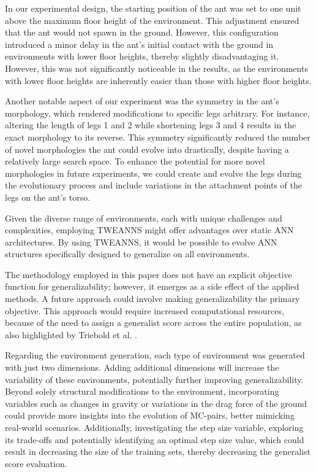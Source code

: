 In our experimental design, the starting position of the ant was set to one unit above the maximum floor height of the environment. This adjustment ensured that the ant would not spawn in the ground. However, this configuration introduced a minor delay in the ant's initial contact with the ground in environments with lower floor heights, thereby slightly disadvantaging it. However, this was not significantly noticeable in the results, as the environments with lower floor heights are inherently easier than those with higher floor heights.

Another notable aspect of our experiment was the symmetry in the ant's morphology, which rendered modifications to  specific legs arbitrary. For instance, altering the length of legs 1 and 2 while shortening legs 3 and 4 results in the exact morphology to its reverse. This symmetry significantly reduced the number of novel morphologies the ant could evolve into drastically, despite having a relatively large search space. To enhance the potential for more novel morphologies in future experiments, we could create and evolve the legs during the evolutionary process and include variations in the attachment points of the legs on the ant's torso. 

Given the diverse range of environments, each with unique challenges and complexities, employing TWEANNS might offer advantages over static ANN architectures. By using TWEANNS, it would be possible to evolve ANN structures specifically designed to generalize on all environments.

The methodology employed in this paper does not have an explicit objective function for generalizability; however, it emerges as a side effect of the applied methods. A future approach could involve making generalizability the primary objective. This approach would require increased computational resources, because of the need to assign a generalist score across the entire population, as also highlighted by Triebold et al. \cite{Corinna_Triebold}.

Regarding the environment generation, each type of environment was generated with just two dimensions. Adding additional dimensions will increase the variability of these environments, potentially further improving generalizability. Beyond solely structural modifications to the environment, incorporating variables such as changes in gravity or variations in the drag force of the ground could provide more insights into the evolution of MC-pairs, better mimicking real-world scenarios. Additionally, investigating the step size variable, exploring its trade-offs and potentially identifying an optimal step size value, which could result in decreasing the size of the training sets, thereby decreasing the generalist score evaluation.